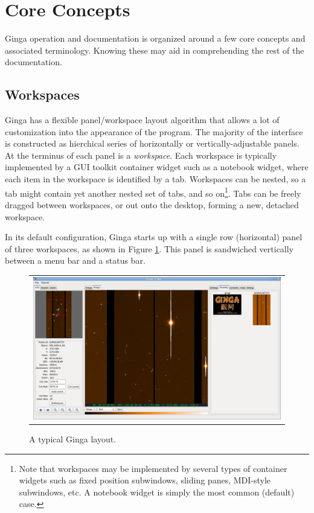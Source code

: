\documentclass[11pt]{report}
\begin{document}
\section{Core Concepts}
Ginga operation and documentation is organized around a few core
concepts and associated terminology.  Knowing these may aid in
comprehending the rest of the documentation. 

\subsection{Workspaces}
Ginga has a flexible panel/workspace layout algorithm that allows a
lot of customization into the appearance of the program.  The majority
of the interface is constructed as hierchical series of horizontally or
vertically-adjustable panels.  At the terminus of each panel is a
\emph{workspace}.
Each workspace is typically
implemented by a GUI toolkit container widget such as a notebook widget,
where each item in the workspace is identified by a tab.  Workspaces can
be nested, so a tab might contain yet another nested set of tabs, and so
on\footnote{Note that workspaces may be implemented by several types of 
  container widgets such as fixed position subwindows, sliding panes,
  MDI-style subwindows, etc.  A notebook widget is simply the most
  common (default) case.}. 
Tabs can be freely dragged between workspaces, or out onto the desktop,
forming a new, detached workspace.

In its default configuration, Ginga starts up with a
single row (horizontal) panel of three workspaces, as shown in
Figure \ref{fig:gingadefault}.
This panel is sandwiched vertically between a menu bar and a status bar.

\begin{figure}
  \begin{center}
    \begin{tabular}{c}
      \includegraphics[width=6in]{gingadefault.png}
    \end{tabular}
  \end{center}
  \caption[example] 
          { \label{fig:gingadefault} 
            A typical Ginga layout.} 
\end{figure} 
\end{document}
